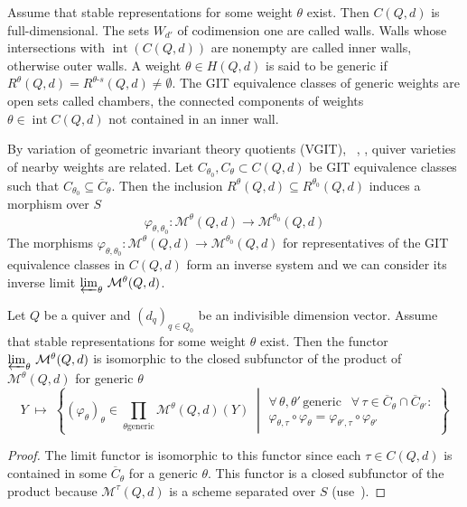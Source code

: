 \documentclass[ALCO,ThmDefs,Unicode,epreuves]{cedram}
\def\phi{\varphi}
\DeclareMathOperator{\interior}{int}
\begin{document}

Assume that stable representations for some weight $\theta$ exist. Then $C(Q,d)$ is 
full-dimensional. The sets $W_{d'}$ of codimension one are called walls. 
Walls whose intersections with $\interior(C(Q,d))$ are nonempty are called inner walls, 
otherwise outer walls. A weight $\theta\in H(Q,d)$ is said to be generic if 
$R^\theta(Q,d)=R^{\theta\text{-}s}(Q,d)\neq\emptyset$. The GIT equivalence classes 
of generic weights are open sets called chambers, the connected components of weights
$\theta\in\interior C(Q,d)$ not contained in an inner wall. 


By variation of geometric invariant theory quotients (VGIT), \cf~\cite{Th96}, 
\cite{DH98}, quiver varieties of nearby weights are related. 
Let $C_{\theta_0},C_\theta\subset C(Q,d)$ be GIT equivalence 
classes such that $C_{\theta_0}\subseteq\overline{C}_\theta$.
Then the inclusion $R^\theta(Q,d)\subseteq R^{\theta_0}(Q,d)$
induces a morphism over $S$
\[\phi_{\theta,\theta_0}\colon\mathcal M^\theta(Q,d)\to\mathcal M^{\theta_0}(Q,d)\] 
The morphisms 
$\phi_{\theta,\theta_0}\colon\mathcal M^\theta(Q,d)\to\mathcal M^{\theta_0}(Q,d)$
for representatives of the GIT equivalence classes in $C(Q,d)$
form an inverse system and we can consider its inverse limit 
$\varprojlim_\theta\,\mathcal M^\theta(Q,d)$. 

\begin{prop}\label{prop:functorinvlim}
Let $Q$ be a quiver and $(d_q)_{q\in Q_0}$ be an indivisible dimension vector. 
Assume that stable representations for some weight $\theta$ exist. 
Then the functor $\varprojlim_\theta\,\mathcal M^\theta(Q,d)$ is isomorphic to the 
closed subfunctor of the product of $\mathcal M^\theta(Q,d)$ for generic $\theta$
\begin{equation}\label{eq:functorinvlim}
Y\;\mapsto\;
\left\{\left.
(\phi_\theta)_\theta\in\!\!\prod_{\theta \text{generic}}\!\!\!
\mathcal M^\theta(Q,d)(Y)
\;\;\right|\;
\begin{array}{l}
\forall\,\theta,\theta'\,\text{generic}\;\;\:
\forall\,\tau\in\overline{C}_\theta\cap\overline{C}_{\theta'}\colon\\
\phi_{\theta,\tau}\circ\phi_\theta=\phi_{\theta',\tau}\circ\phi_{\theta'}
\end{array}
\right\}
\end{equation}
\end{prop}
\begin{proof}
The limit functor is isomorphic to this functor since each $\tau\in C(Q,d)$ 
is contained in some $\overline{C}_\theta$ for a generic $\theta$.
This functor is a closed subfunctor of the product because $\mathcal M^\tau(Q,d)$
is a scheme separated over $S$ (use~\cite[(5.2.5)]{EGA1}).
\end{proof}
\end{document}
